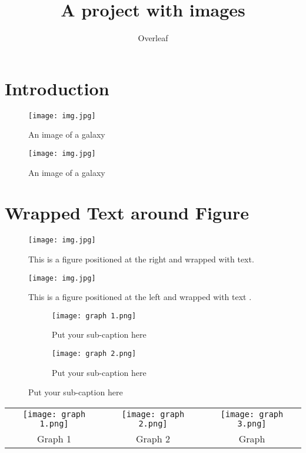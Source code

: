 \documentclass{article}
\title{A project with images}
\author{Overleaf}
\date{}
\begin{document}
\maketitle

\section{Introduction}


\begin{figure}[h]
    \centering
    \texttt{[image: img.jpg]}
    \caption{An image of a galaxy}
    \label{fig:galaxy}

\end{figure}

\begin{figure}[h]
    \centering
    \texttt{[image: img.jpg]}
    \caption{An image of a galaxy}
    \label{fig:galaxy}
\end{figure}

\newpage

\section{Wrapped Text around Figure}

\begin{wrapfigure}{r}{0.4\textwidth}
\centering
    \texttt{[image: img.jpg]}
    \caption{This is a figure positioned at the right and wrapped with text.}
    \label{fig:img1}
\end{wrapfigure}
\blindtext
\blindtext 
\begin{wrapfigure}{l}{0.35\textwidth}
    \centering
    \texttt{[image: img.jpg]}
    \caption{This is a figure positioned at the left and wrapped with text .}
    \label{fig :img2}
\end{wrapfigure}

\blindtext




\begin{figure}
\begin{subfigure}{.5\textwidth}
  \centering
  \texttt{[image: graph 1.png]}  
  \caption{Put your sub-caption here}
  \label{fig:sub-first}
\end{subfigure}
\begin{subfigure}{.5\textwidth}
  \centering
  \texttt{[image: graph 2.png]}  
  \caption{Put your sub-caption here}
  \label{fig:sub-second}
\end{subfigure}
\end{figure}

\newpage

\begin{tabular}{c c c}

    \texttt{[image: graph 1.png]}
    & \texttt{[image: graph 2.png]}
     & \texttt{[image: graph 3.png]}
     \\ Graph 1 & Graph 2 & Graph \\
     
\end{tabular}
\end{document}
